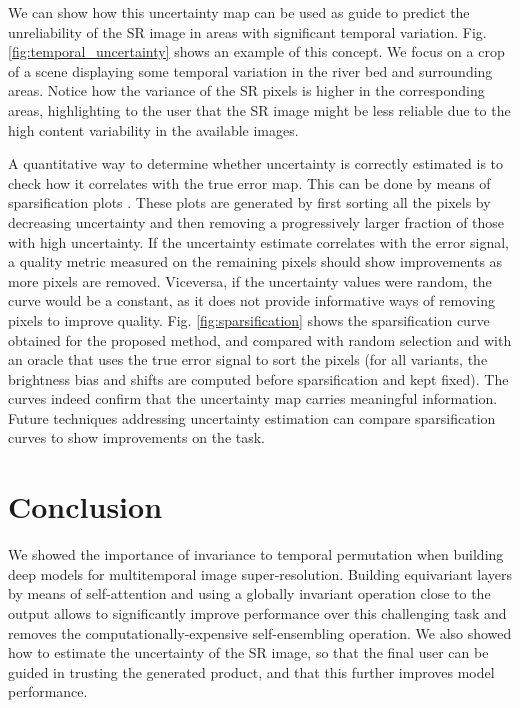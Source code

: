 \documentclass[journal]{IEEEtran}
\begin{document}
We can show how this uncertainty map can be used as guide to predict the unreliability of the SR image in areas with significant temporal variation. Fig. \ref{fig:temporal_uncertainty} shows an example of this concept. We focus on a crop of a scene displaying some temporal variation in the river bed and surrounding areas. Notice how the variance of the SR pixels is higher in the corresponding areas, highlighting to the user that the SR image might be less reliable due to the high content variability in the available images.

A quantitative way to determine whether uncertainty is correctly estimated is to check how it correlates with the true error map. This can be done by means of sparsification plots \cite{mac2012learning}. These plots are generated by first sorting all the pixels by decreasing uncertainty and then removing a progressively larger fraction of those with high uncertainty. If the uncertainty estimate correlates with the error signal, a quality metric measured on the remaining pixels should show improvements as more pixels are removed. Viceversa, if the uncertainty values were random, the curve would be a constant, as it does not provide informative ways of removing pixels to improve quality. Fig. \ref{fig:sparsification} shows the sparsification curve obtained for the proposed method, and compared with random selection and with an oracle that uses the true error signal to sort the pixels (for all variants, the brightness bias and shifts are computed before sparsification and kept fixed). The curves indeed confirm that the uncertainty map carries meaningful information. Future techniques addressing uncertainty estimation can compare sparsification curves to show improvements on the task.










\section{Conclusion}
\label{sec:conclusions}
We showed the importance of invariance to temporal permutation when building deep models for multitemporal image super-resolution. Building equivariant layers by means of self-attention and using a globally invariant operation close to the output allows to significantly improve performance over this challenging task and removes the computationally-expensive self-ensembling operation. We also showed how to estimate the uncertainty of the SR image, so that the final user can be guided in trusting the generated product, and that this further improves model performance.  






\end{document}
